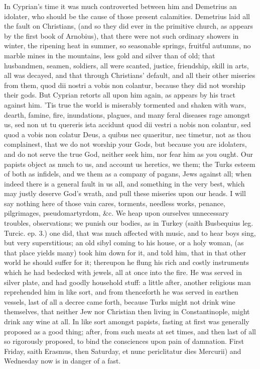 {In Cyprian's time it was much controverted between him and Demetrius an
idolater, who should be the cause of those present calamities.
Demetrius laid all the fault on Christians, (and so they did ever in
the primitive church, as appears by the first book of Arnobius),
that there were not such ordinary showers in winter, the ripening
heat in summer, so seasonable springs, fruitful autumns, no marble
mines in the mountains, less gold and silver than of old; that
husbandmen, seamen, soldiers, all were scanted, justice, friendship,
skill in arts, all was decayed, and that through Christians' default,
and all their other miseries from them, quod dii nostri a vobis non
colantur, because they did not worship their gods. But Cyprian retorts
all upon him again, as appears by his tract against him. 'Tis true the
world is miserably tormented and shaken with wars, dearth, famine,
fire, inundations, plagues, and many feral diseases rage amongst us,
sed non ut tu quereris ista accidunt quod dii vestri a nobis non
colantur, sed quod a vobis non colatur Deus, a quibus nec quaeritur,
nec timetur, not as thou complainest, that we do not worship your Gods,
but because you are idolaters, and do not serve the true God, neither
seek him, nor fear him as you ought. Our papists object as much to us,
and account us heretics, we them; the Turks esteem of both as infidels,
and we them as a company of pagans, Jews against all; when indeed there
is a general fault in us all, and something in the very best, which may
justly deserve God's wrath, and pull these miseries upon our heads. I
will say nothing here of those vain cares, torments, needless works,
penance, pilgrimages, pseudomartyrdom, \&c. We heap upon ourselves
unnecessary troubles, observations; we punish our bodies, as in Turkey
(saith Busbequius leg. Turcic. ep. 3.) one did, that was much
affected with music, and to hear boys sing, but very superstitious; an
old sibyl coming to his house, or a holy woman, (as that place yields
many) took him down for it, and told him, that in that other world he
should suffer for it; thereupon he flung his rich and costly
instruments which he had bedecked with jewels, all at once into the
fire. He was served in silver plate, and had goodly household stuff: a
little after, another religious man reprehended him in like sort, and
from thenceforth he was served in earthen vessels, last of all a decree
came forth, because Turks might not drink wine themselves, that neither
Jew nor Christian then living in Constantinople, might drink any wine
at all. In like sort amongst papists, fasting at first was generally
proposed as a good thing; after, from such meats at set times, and then
last of all so rigorously proposed, to bind the consciences upon pain
of damnation. First Friday, saith Erasmus, then Saturday, et nunc
periclitatur dies Mercurii) and Wednesday now is in danger of a fast.

}

